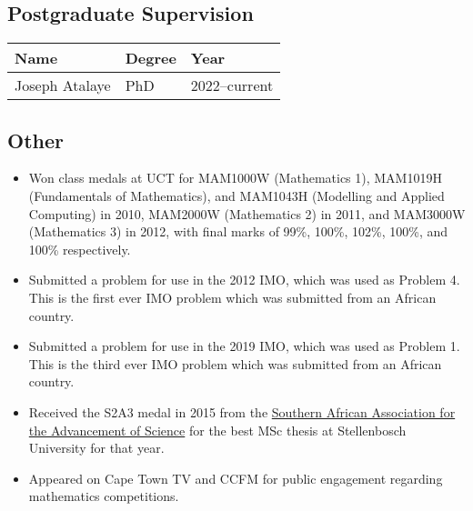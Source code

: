 \documentclass{article}
\begin{document}
\subsection{Postgraduate Supervision}
\begin{center} \begin{tabular}{lll}
	\toprule
	Name						& Degree	& Year \\
	\midrule
	Joseph Atalaye	& PhD			& 2022--current \\
	\bottomrule
\end{tabular} \end{center}

\subsection{Other}
\begin{itemize}
	\item Won class medals at UCT for MAM1000W (Mathematics 1), MAM1019H (Fundamentals of Mathematics), and MAM1043H (Modelling and Applied Computing) in 2010, MAM2000W (Mathematics 2) in 2011, and MAM3000W (Mathematics 3) in 2012, with final marks of 99\%, 100\%, 102\%, 100\%, and 100\% respectively.
	\item Submitted a problem for use in the 2012 IMO, which was used as Problem 4. This is the first ever IMO problem which was submitted from an African country.
	\item Submitted a problem for use in the 2019 IMO, which was used as Problem 1. This is the third ever IMO problem which was submitted from an African country.
	\item Received the S2A3 medal in 2015 from the \href{http://s2a3.org.za/joomla/index.php}{Southern African Association for the Advancement of Science} for the best MSc thesis at Stellenbosch University for that year.
	\item Appeared on Cape Town TV and CCFM for public engagement regarding mathematics competitions.
\end{itemize}


\end{document}

